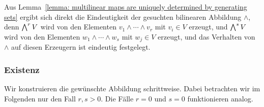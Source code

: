 Aus Lemma~\ref{lemma: multilinear maps are uniquely determined by generating sets} ergibt sich direkt die Eindeutigkeit der gesuchten bilinearen Abbildung $\wedge$, denn $\bigwedge^{r} V$ wird von den Elementen $v_1 \wedge \dotsb \wedge v_r$ mit $v_i \in V$ erzeugt, und $\bigwedge^{s} V$ wird von den Elementen $w_1 \wedge \dotsb \wedge w_s$ mit $w_j \in V$ erzeugt, und das Verhalten von $\wedge$ auf diesen Erzeugern ist eindeutig festgelegt.



\subsubsection{Existenz}
Wir konstruieren die gewünschte Abbildung schrittweise.
Dabei betrachten wir im Folgenden nur den Fall $r, s > 0$.
Die Fälle $r = 0$ und $s = 0$ funktionieren analog.

